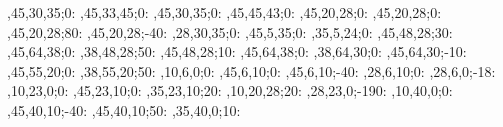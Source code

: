 \begin{chart}
,45,30,35;0:    %
,45,33,45;0:    %
,45,30,35;0:    %
,45,45,43;0:    %
,45,20,28;0:    %
,45,20,28;0:    %
,45,20,28;80:   %
,45,20,28;-40:  %
,28,30,35;0:    %
,45,5,35;0:     %
,35,5,24;0:     %
,45,48,28;30:   %
,45,64,38;0:    %
,38,48,28;50:   %
,45,48,28;10:   %
,45,64,38;0:    %
,38,64,30;0:    %
,45,64,30;-10:  %
,45,55,20;0:    %
,38,55,20;50:   %
,10,6,0;0:       %
,45,6,10;0:     %
,45,6,10;-40:   %
,28,6,10;0:     %
,28,6,0;-18:    %
,10,23,0;0:     %
,45,23,10;0:    %
,35,23,10;20:   %
,10,20,28;20:    %
,28,23,0;-190:  %
,10,40,0;0:     %
,45,40,10;-40:  %
,45,40,10;50:   %
,35,40,0;10:    %
\end{chart}
\egroup
